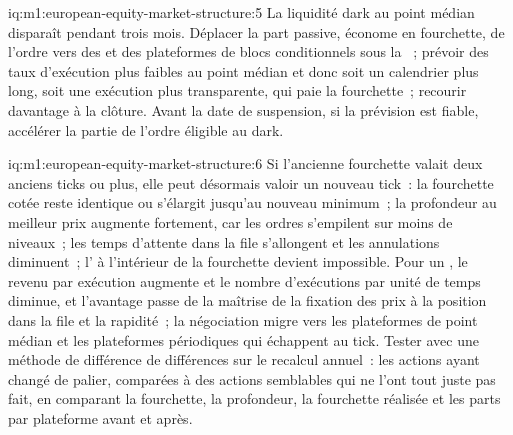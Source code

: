 \begin{solution}{iq:m1:european-equity-market-structure:5}
La liquidité dark au point médian disparaît pendant trois mois. Déplacer la part
passive, économe en fourchette, de l'ordre vers des  et des
plateformes de blocs conditionnels sous la ~; prévoir des taux d'exécution plus faibles au
point médian et donc soit un calendrier plus long, soit une exécution plus transparente, qui
paie la fourchette~; recourir davantage à la clôture. Avant la date de suspension, si la prévision est
fiable, accélérer la partie de l'ordre éligible au dark.
\end{solution}

\begin{solution}{iq:m1:european-equity-market-structure:6}
Si l'ancienne fourchette valait deux anciens ticks ou plus, elle peut désormais valoir un nouveau tick~: la
fourchette cotée reste identique ou s'élargit jusqu'au nouveau minimum~; la profondeur au meilleur
prix augmente fortement, car les ordres s'empilent sur moins de niveaux~; les temps d'attente dans la file
s'allongent et les annulations diminuent~; l' à l'intérieur de la fourchette devient
impossible. Pour un , le revenu par exécution augmente et le nombre d'exécutions par unité de
temps diminue, et l'avantage passe de la maîtrise de la fixation des prix à la position dans la file et
la rapidité~; la négociation migre vers les plateformes de point médian et les plateformes périodiques qui échappent au
tick. Tester avec une méthode de différence de différences sur le recalcul annuel~:
les actions ayant changé de palier, comparées à des actions semblables qui ne l'ont tout juste pas fait, en comparant
la fourchette, la profondeur, la fourchette réalisée et les parts par plateforme avant et après.
\end{solution}
